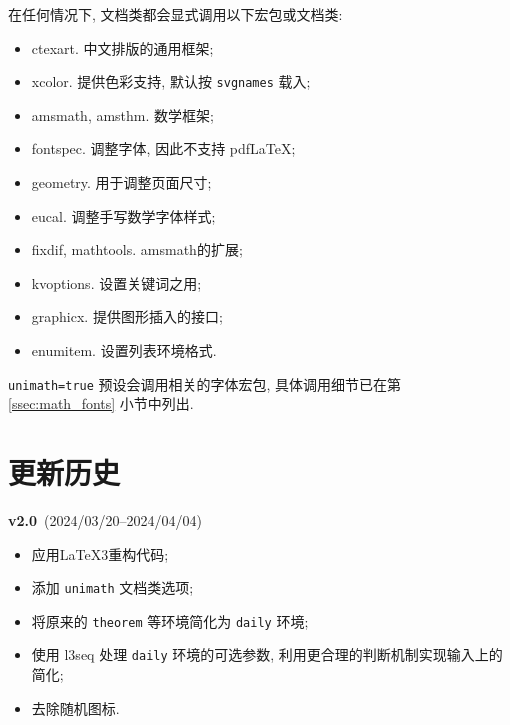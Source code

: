 \documentclass{SYSUDaily}
\begin{document}
在任何情况下, 文档类都会显式调用以下宏包或文档类:
\begin{itemize}[parsep=0pt,itemsep=0pt]
	\item
			\textsf{ctexart}. 中文排版的通用框架;
	\item
			\textsf{xcolor}. 提供色彩支持, 默认按 \verb|svgnames| 载入;
	\item
			\textsf{amsmath}, \textsf{amsthm}. 数学框架;
	\item
			\textsf{fontspec}. 调整字体, 因此不支持 pdf\LaTeX{};
	\item
			\textsf{geometry}. 用于调整页面尺寸;
	\item
			\textsf{eucal}. 调整手写数学字体样式;
	\item
			\textsf{fixdif}, \textsf{mathtools}. \textsf{amsmath}的扩展;
	\item
			\textsf{kvoptions}. 设置关键词之用;
	\item
			\textsf{graphicx}. 提供图形插入的接口;
	\item
			\textsf{enumitem}. 设置列表环境格式.
\end{itemize}
\verb|unimath=true| 预设会调用相关的字体宏包, 具体调用细节已在第 \ref{ssec:math_fonts} 小节中列出.

\section{更新历史}
\begin{flushleft}
	\footnotesize
	\textbf{v2.0}~(2024/03/20--2024/04/04)
	\begin{itemize}[parsep=0pt,itemsep=0pt]
		\item
				应用\LaTeX{3}重构代码;
		\item
				添加 \verb|unimath| 文档类选项;
		\item
				将原来的 \verb|theorem| 等环境简化为 \verb|daily| 环境;
		\item
				使用 \textsf{l3seq} 处理 \verb|daily| 环境的可选参数, 利用更合理的判断机制实现输入上的简化;
		\item
				去除随机图标.
	\end{itemize}
\end{flushleft}
\end{document}
